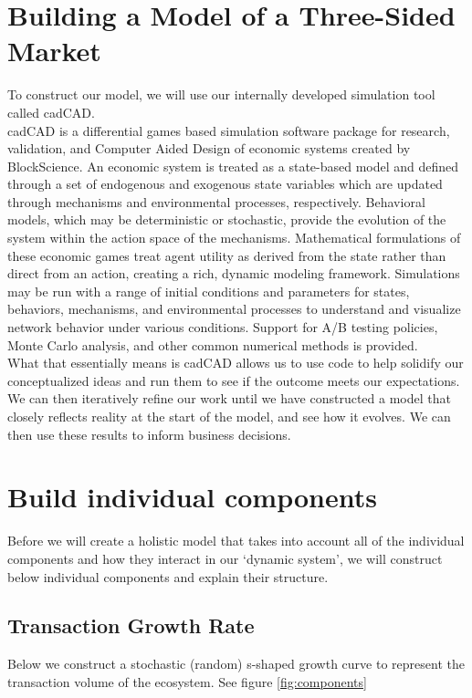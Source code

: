 \documentclass[12pt]{extarticle}
\begin{document}
\section{Building a Model of a Three-Sided Market}
To construct our model, we will use our internally developed simulation tool called cadCAD. \\

cadCAD is a differential games based simulation software package for research, validation, and Computer Aided Design of economic systems created by BlockScience. An economic system is treated as a state-based model and defined through a set of endogenous and exogenous state variables which are updated through mechanisms and environmental processes, respectively. Behavioral models, which may be deterministic or stochastic, provide the evolution of the system within the action space of the mechanisms. Mathematical formulations of these economic games treat agent utility as derived from the state rather than direct from an action, creating a rich, dynamic modeling framework. Simulations may be run with a range of initial conditions and parameters for states, behaviors, mechanisms, and environmental processes to understand and visualize network behavior under various conditions. Support for A/B testing policies, Monte Carlo analysis, and other common numerical methods is provided. \\ 

What that essentially means is cadCAD allows us to use code to help solidify our conceptualized ideas and run them to see if the outcome meets our expectations. We can then iteratively refine our work until we have constructed a model that closely reflects reality at the start of the model, and see how it evolves. We can then use these results to inform business decisions.

\section{Build individual components}
Before we will create a holistic model that takes into account all of the individual components and how they interact in our `dynamic system', we will construct below individual components and explain their structure.

\subsection{Transaction Growth Rate}
Below we construct a stochastic (random) s-shaped growth curve to represent the transaction volume of the ecosystem. See figure \ref{fig:components}
\end{document}
